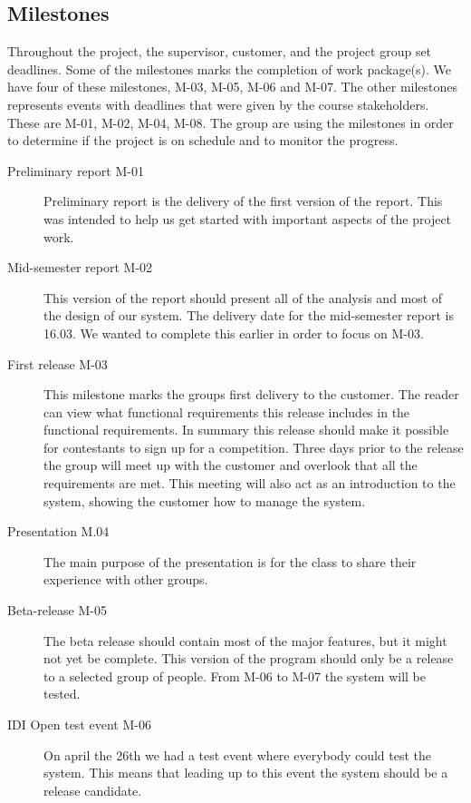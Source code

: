 \subsection{Milestones}
Throughout the project, the supervisor, customer, and the project group
set deadlines.
Some of the milestones marks the completion of work package(s). We have
four of these milestones, M-03, M-05, M-06 and M-07. The other
milestones represents events with deadlines that were given by the
course stakeholders. These are M-01, M-02, M-04, M-08. The group are
using the milestones in order to determine if the project is on
schedule and to monitor the progress.

\begin{description}
    \item[Preliminary report M-01]
    Preliminary report is the delivery of the first version of the report.
    This was intended to help us get started with important aspects of the
    project work.

    \item[Mid-semester report M-02]
    This version of the report should present all of the analysis and most
    of the design of our system. The delivery date for the mid-semester
    report is 16.03. We wanted to complete this earlier in order to focus
    on M-03.

    \item[First release M-03]
    This milestone marks the groups first delivery to the customer. The
    reader can view what functional requirements this release includes in
    the functional requirements. In summary this release should
    make it possible for contestants to sign up for a competition. Three
    days prior to the release the group will meet up with the customer and
    overlook that all the requirements are met. This meeting will also act
    as an introduction to the system, showing the customer how to manage
    the system. 

    \item[Presentation M.04]
    The main purpose of the presentation is for the class to share their
    experience with other groups. 

    \item[Beta-release M-05]
    The beta release should contain most of the major features, but it might
    not yet be complete. This version of the program should only be a
    release to a selected group of people. From M-06 to M-07 the system
    will be tested.

    \item[IDI Open test event M-06]
    On april the 26th we had a test event where everybody could test the
    system. This means that leading up to this event the system should be a
    release candidate. 


\end{description}
